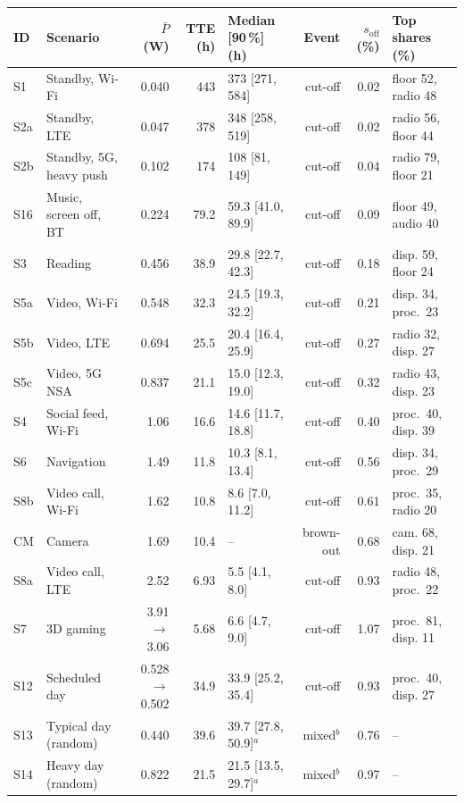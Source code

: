 \setlength{\tabcolsep}{3pt}%
\begin{tabular}{@{}llrrlrrl@{}}
\toprule
ID & Scenario & $\bar P$ (W) & TTE (h) & Median [90\,\%] (h) & Event & $s_{\mathrm{off}}$ (\%) & Top shares (\%) \\
\midrule
S1 & Standby, Wi-Fi & 0.040 & 443 & 373 [271, 584] & cut-off & 0.02 & floor 52, radio 48 \\
S2a & Standby, LTE & 0.047 & 378 & 348 [258, 519] & cut-off & 0.02 & radio 56, floor 44 \\
S2b & Standby, 5G, heavy push & 0.102 & 174 & 108 [81, 149] & cut-off & 0.04 & radio 79, floor 21 \\
S16 & Music, screen off, BT & 0.224 & 79.2 & 59.3 [41.0, 89.9] & cut-off & 0.09 & floor 49, audio 40 \\
S3 & Reading & 0.456 & 38.9 & 29.8 [22.7, 42.3] & cut-off & 0.18 & disp. 59, floor 24 \\
S5a & Video, Wi-Fi & 0.548 & 32.3 & 24.5 [19.3, 32.2] & cut-off & 0.21 & disp. 34, proc.\ 23 \\
S5b & Video, LTE & 0.694 & 25.5 & 20.4 [16.4, 25.9] & cut-off & 0.27 & radio 32, disp. 27 \\
S5c & Video, 5G NSA & 0.837 & 21.1 & 15.0 [12.3, 19.0] & cut-off & 0.32 & radio 43, disp. 23 \\
S4 & Social feed, Wi-Fi & 1.06 & 16.6 & 14.6 [11.7, 18.8] & cut-off & 0.40 & proc.\ 40, disp. 39 \\
S6 & Navigation & 1.49 & 11.8 & 10.3 [8.1, 13.4] & cut-off & 0.56 & disp. 34, proc.\ 29 \\
S8b & Video call, Wi-Fi & 1.62 & 10.8 & 8.6 [7.0, 11.2] & cut-off & 0.61 & proc.\ 35, radio 20 \\
CM & Camera & 1.69 & 10.4 & -- & brown-out & 0.68 & cam. 68, disp. 21 \\
S8a & Video call, LTE & 2.52 & 6.93 & 5.5 [4.1, 8.0] & cut-off & 0.93 & radio 48, proc.\ 22 \\
S7 & 3D gaming & 3.91$\to$3.06 & 5.68 & 6.6 [4.7, 9.0] & cut-off & 1.07 & proc.\ 81, disp. 11 \\
\midrule
S12 & Scheduled day & 0.528$\to$0.502 & 34.9 & 33.9 [25.2, 35.4] & cut-off & 0.93 & proc.\ 40, disp. 27 \\
S13 & Typical day (random) & 0.440 & 39.6 & 39.7 [27.8, 50.9]$^{a}$ & mixed$^{b}$ & 0.76 & -- \\
S14 & Heavy day (random) & 0.822 & 21.5 & 21.5 [13.5, 29.7]$^{a}$ & mixed$^{b}$ & 0.97 & -- \\
\bottomrule
\end{tabular}
